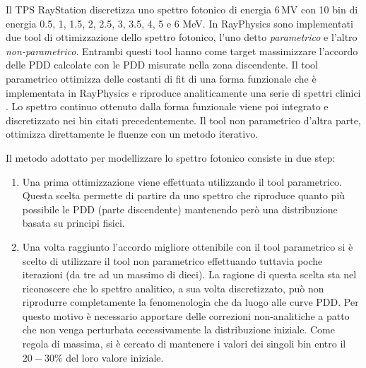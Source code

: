 Il TPS RayStation discretizza uno spettro fotonico di energia $6\,$MV con 10 bin di energia 0.5, 1, 1.5, 2, 2.5, 3, 3.5, 4, 5 e 6 MeV. In RayPhysics sono implementati due tool di ottimizzazione dello spettro fotonico, l'uno detto \textit{parametrico} e l'altro \textit{non-parametrico}. Entrambi questi tool hanno come target massimizzare l'accordo delle PDD calcolate con le PDD misurate nella zona discendente. Il tool parametrico ottimizza delle costanti di fit di una forma funzionale che è implementata in RayPhysics e riproduce analiticamente una serie di spettri clinici \cite{RaySearchLaboratories2014}. Lo spettro continuo ottenuto dalla forma funzionale viene poi integrato e discretizzato nei bin citati precedentemente. Il tool non parametrico d'altra parte, ottimizza direttamente le fluenze con un metodo iterativo.

Il metodo adottato per modellizzare lo spettro fotonico consiste in due step:
\begin{enumerate}
\item Una prima ottimizzazione viene effettuata utilizzando il tool parametrico. Questa scelta permette di partire da uno spettro che riproduce quanto più possibile le PDD (parte discendente) mantenendo però una distribuzione basata su principi fisici.
\item Una volta raggiunto l'accordo migliore ottenibile con il tool parametrico si è scelto di utilizzare il tool non parametrico effettuando tuttavia poche iterazioni (da tre ad un massimo di dieci). La ragione di questa scelta sta nel riconoscere che lo spettro analitico, a sua volta discretizzato, può non riprodurre completamente la fenomenologia che da luogo alle curve PDD. Per questo motivo è necessario apportare delle correzioni non-analitiche a patto che non venga perturbata eccessivamente la distribuzione iniziale. Come regola di massima, si è cercato di mantenere i valori dei singoli bin entro il $20-30\%$ del loro valore iniziale.
\end{enumerate}

